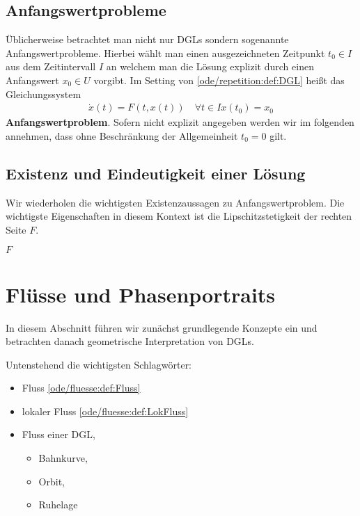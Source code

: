 \documentclass[letterpaper,10pt,english]{jupyterBook}
\begin{document}
\subsection{Anfangswertprobleme}
\label{\detokenize{ode/repetition:anfangswertprobleme}}
Üblicherweise betrachtet man nicht nur DGLs sondern sogenannte Anfangswertprobleme. Hierbei wählt man einen ausgezeichneten Zeitpunkt \(t_0\in I\) aus dem Zeitintervall \(I\) an welchem man die Lösung explizit durch einen Anfangswert \(x_0\in U\) vorgibt. Im Setting von \cref{ode/repetition:def:DGL} heißt
das Gleichungssystem
\begin{align}\label{equation:ode/repetition:eq:AWP}
\dot{x}(t) = F(t, x(t))\quad\forall t\in I
x(t_0) = x_0
\end{align}
\textbf{Anfangswertproblem}. Sofern nicht explizit angegeben werden wir im folgenden annehmen, dass ohne Beschränkung der Allgemeinheit \(t_0=0\) gilt.


\subsection{Existenz und Eindeutigkeit einer Lösung}
\label{\detokenize{ode/repetition:existenz-und-eindeutigkeit-einer-losung}}
Wir wiederholen die wichtigsten Existenzaussagen zu Anfangswertproblem. Die wichtigste Eigenschaften in diesem Kontext ist die Lipschitzstetigkeit der rechten Seite \(F\).
\label{ode/repetition:definition-3}
\begin{definition}{}{}



\(F\)
\end{definition}


\section{Flüsse und Phasenportraits}
\label{\detokenize{ode/fluesse:flusse-und-phasenportraits}}\label{\detokenize{ode/fluesse:s-fluesse}}\label{\detokenize{ode/fluesse::doc}}
In diesem Abschnitt führen wir zunächst grundlegende Konzepte ein und betrachten danach geometrische Interpretation von DGLs.

Untenstehend die wichtigsten Schlagwörter:
\begin{itemize}
\item {} 
Fluss \cref{ode/fluesse:def:Fluss} 

\item {} 
lokaler Fluss \cref{ode/fluesse:def:LokFluss} 

\item {} 
Fluss einer DGL,
\begin{itemize}
\item {} 
Bahnkurve,

\item {} 
Orbit,

\item {} 
Ruhelage

\end{itemize}

\end{itemize}
\end{document}
